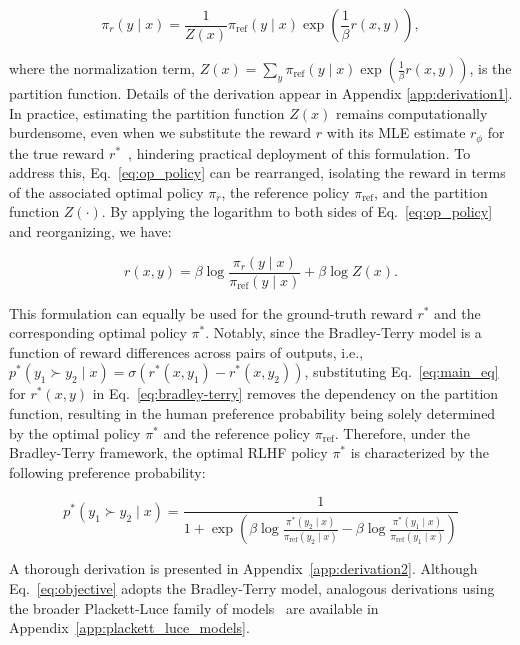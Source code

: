 \begin{equation}\label{eq:op_policy}
    \pi_r(y\mid x) = \frac{1}{Z(x)}\pi_\text{ref}(y\mid x)\exp\left(\frac{1}{\beta}r(x, y)\right),
\end{equation}

where the normalization term, $Z(x) =\sum_{y}\pi_\text{ref}(y\mid x)\exp\left(\frac{1}{\beta}r(x, y)\right)$, is the partition function. Details of the derivation appear in Appendix \ref{app:derivation1}. In practice, estimating the partition function $Z(x)$ remains computationally burdensome, even when we substitute the reward $r$ with its MLE estimate $r_\phi$ for the true reward $r^*$~\citep{korbak2022reinforcement, go2023aligning}, hindering practical deployment of this formulation. To address this, Eq.~\ref{eq:op_policy} can be rearranged, isolating the reward in terms of the associated optimal policy $\pi_r$, the reference policy $\pi_\text{ref}$, and the partition function $Z(\cdot)$. By applying the logarithm to both sides of Eq.~\ref{eq:op_policy} and reorganizing, we have:

\begin{equation}\label{eq:main_eq}
    r(x,y) =\beta \log \frac{\pi_r(y\mid x)}{\pi_\text{ref}(y\mid x)} + \beta \log Z(x).
\end{equation}

This formulation can equally be used for the ground-truth reward $r^*$ and the corresponding optimal policy $\pi^*$. Notably, since the Bradley-Terry model is a function of reward differences across pairs of outputs, i.e., ${p^*(y_1 \succ y_2 \mid x) = \sigma(r^*(x, y_1) - r^*(x, y_2))}$, substituting Eq.~\ref{eq:main_eq} for $r^*(x,y)$ in Eq.~\ref{eq:bradley-terry} removes the dependency on the partition function, resulting in the human preference probability being solely determined by the optimal policy $\pi^*$ and the reference policy $\pi_\text{ref}$. Therefore, under the Bradley-Terry framework, the optimal RLHF policy $\pi^*$ is characterized by the following preference probability:

\begin{equation}\label{eq:objective}
    p^*(y_1\succ y_2 \mid x)=\frac{1}{1 + \exp\left(\beta \log \frac{\pi^*(y_2\mid x)}{\pi_\text{ref}(y_2\mid x)} - \beta \log \frac{\pi^*(y_1\mid x)}{\pi_\text{ref}(y_1\mid x)}\right)}
\end{equation}

A thorough derivation is presented in Appendix~\ref{app:derivation2}. Although Eq.~\ref{eq:objective} adopts the Bradley-Terry model, analogous derivations using the broader Plackett-Luce family of models~\citep{plackett1975analysis, luce2012individual} are available in Appendix~\ref{app:plackett_luce_models}.

